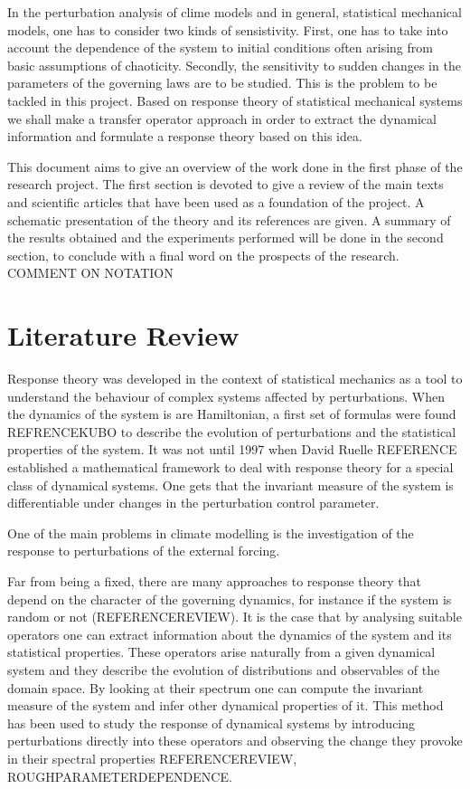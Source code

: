 
\noindent In the perturbation analysis of clime models and in general, statistical mechanical models, one has to consider two kinds of sensistivity. First, one has to take into account the dependence of the system to initial conditions often arising from basic assumptions of chaoticity. Secondly, the sensitivity to sudden changes in the parameters of the governing laws are to be studied. This is the problem to be tackled in this project. Based on response theory of statistical mechanical systems we shall make a transfer operator approach in order to extract the dynamical information and formulate a response theory based on this idea.

This document aims to give an overview of the work done in the first phase of the research project. The first section is devoted to give a review of the main texts and scientific articles that have been used as a foundation of the project. A schematic presentation of the theory and its references are given. A summary of the results obtained and the experiments performed will be done in the second section, to conclude with a final word on the prospects of the research.
COMMENT ON NOTATION


\section*{Literature Review}

Response theory was developed in the context of statistical mechanics as a tool to understand the behaviour of complex systems affected by perturbations. When the dynamics of the system is are Hamiltonian, a first set of formulas were found REFRENCEKUBO to describe the evolution of perturbations and the statistical properties of the system. It was not until 1997 when David Ruelle REFERENCE established a mathematical framework to deal with response theory for a special class of dynamical systems. One gets that the invariant measure of the system is differentiable under changes in the perturbation control parameter.

One of the main problems in climate modelling is the investigation of the response to perturbations of the external forcing.

Far from being a fixed, there are many approaches to response theory that depend on the character of the governing dynamics, for instance if the system is random or not (REFERENCEREVIEW). It is the case that by analysing suitable operators one can extract information about the dynamics of the system and its statistical properties. These operators arise naturally from a given dynamical system and they describe the evolution of distributions and observables of the domain space. By looking at their spectrum one can compute the invariant measure of the system and infer other dynamical properties of it. This method has been used to study the response of dynamical systems by introducing perturbations directly into these operators and observing the change they provoke in their spectral properties REFERENCEREVIEW, ROUGHPARAMETERDEPENDENCE.


